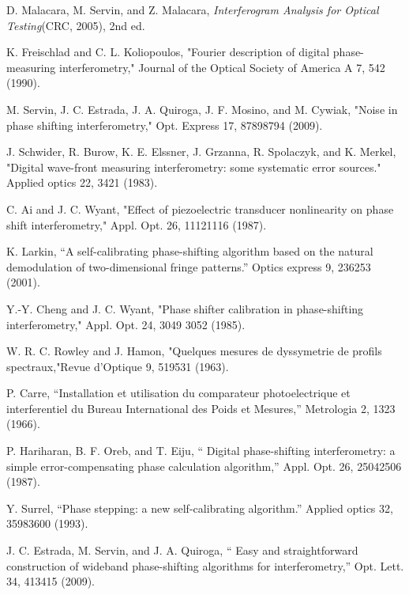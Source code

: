 \begin{thebibliography}{99}
D. Malacara, M. Servin, and Z. Malacara, \textit{Interferogram
Analysis for Optical Testing}(CRC, 2005), 2nd ed.

K. Freischlad and C. L. Koliopoulos, "Fourier
description of digital phase-measuring interferometry,"
Journal of the Optical Society of America A 7, 542 (1990).

M. Servin, J. C. Estrada, J. A. Quiroga, J. F. Mosino,
and M. Cywiak, "Noise in phase shifting interferometry,"
Opt. Express 17, 8789\textendash{}8794 (2009).

 J. Schwider, R. Burow, K. E. Elssner, J. Grzanna,
R. Spolaczyk, and K. Merkel, "Digital wave-front
measuring interferometry: some systematic error sources."
Applied optics 22, 3421 (1983).

C. Ai and J. C. Wyant, "Effect of
piezoelectric transducer nonlinearity on phase shift interferometry,"
Appl. Opt. 26, 1112\textendash{}1116 (1987).

K. Larkin, \textquotedblleft{}A self-calibrating phase-shifting
algorithm based on the natural demodulation of two-dimensional fringe
patterns.\textquotedblright{} Optics express 9, 236\textendash{}253
(2001).

Y.-Y. Cheng and J. C. Wyant, "Phase
shifter calibration in phase-shifting interferometry,"
Appl. Opt. 24, 3049\textendash{} 3052 (1985).

W. R. C. Rowley and J. Hamon, "Quelques
mesures de dyssymetrie de profils spectraux,"Revue
d\textquoteright{}Optique 9, 519\textendash{}531 (1963).

P. Carre, \textquotedblleft{}Installation et utilisation
du comparateur photoelectrique et interferentiel du Bureau International
des Poids et Mesures,\textquotedblright{} Metrologia 2, 13\textendash{}23
(1966).

 P. Hariharan, B. F. Oreb, and T. Eiju, \textquotedblleft{}
Digital
phase-shifting interferometry: a simple error-compensating phase calculation
algorithm,\textquotedblright{} Appl. Opt. 26, 2504\textendash{}2506
(1987).

 Y. Surrel, \textquotedblleft{}Phase stepping: a new
self-calibrating algorithm.\textquotedblright{} Applied optics 32,
3598\textendash{}3600 (1993).

 J. C. Estrada, M. Servin, and J. A. Quiroga, \textquotedblleft{}
Easy
and straightforward construction of wideband phase-shifting algorithms
for interferometry,\textquotedblright{} Opt. Lett. 34, 413\textendash{}415
(2009).


\end{thebibliography}
